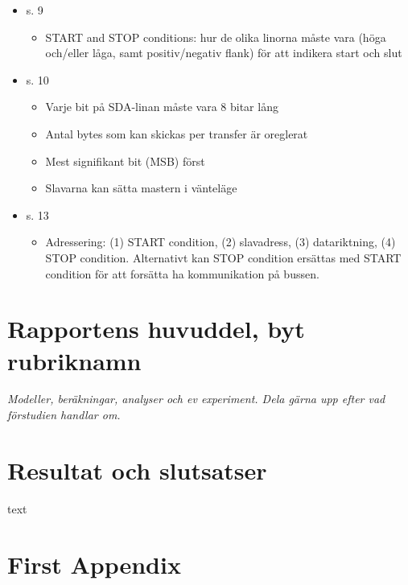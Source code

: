 \documentclass[11pt]{article}
\begin{document}
\begin{flushleft}
\begin{itemize}
		\item s. 9
		\begin{itemize}
			\item START and STOP conditions: hur de olika linorna måste vara (höga och/eller låga, samt positiv/negativ flank) för att indikera start och slut
		\end{itemize}
		
		\item s. 10
		\begin{itemize}
			\item Varje bit på SDA-linan måste vara 8 bitar lång
			\item Antal bytes som kan skickas per transfer är oreglerat
			\item Mest signifikant bit (MSB) först
			\item Slavarna kan sätta mastern i vänteläge
		\end{itemize}
		
		\item s. 13
		\begin{itemize}
			\item Adressering: (1) START condition, (2) slavadress, (3) datariktning, (4) STOP condition. Alternativt kan STOP condition ersättas med START condition för att forsätta ha kommunikation på bussen.
		\end{itemize}
\end{itemize}			

\pagebreak

\section{Rapportens huvuddel, byt rubriknamn}
\textit{Modeller, beräkningar, analyser och ev experiment. Dela gärna upp efter vad förstudien handlar om.}

\pagebreak

\section{Resultat och slutsatser}
text

\pagebreak
{}



\pagebreak
\appendix
\section{First Appendix}

\end{flushleft}
\end{document}
